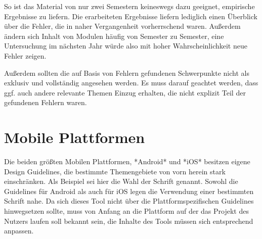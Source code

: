 So ist das Material von nur zwei Semestern keineswegs dazu geeignet, empirische Ergebnisse zu liefern. Die erarbeiteten Ergebnisse liefern lediglich einen Überblick über die Fehler, die in naher Vergangenheit vorherrschend waren. Außerdem ändern sich Inhalt von Modulen häufig von Semester zu Semester, eine Untersuchung im nächsten Jahr würde also mit hoher Wahrscheinlichkeit neue Fehler zeigen.

Außerdem sollten die auf Basis von Fehlern gefundenen Schwerpunkte nicht als exklusiv und vollständig angesehen werden. Es muss darauf geachtet werden, dass ggf. auch andere relevante Themen Einzug erhalten, die nicht explizit Teil der gefundenen Fehlern waren.


\section{Mobile Plattformen}
Die beiden größten Mobilen Plattformen, *Android* und *iOS* besitzen eigene Design Guidelines, die bestimmte Themengebiete von vorn herein stark einschränken.
Als Beispiel sei hier die Wahl der Schrift genannt. Sowohl die Guidelines für Android als auch für iOS legen die Verwendung einer bestimmten Schrift nahe.
Da sich dieses Tool nicht über die Plattformspezifischen Guidelines hinwegsetzen sollte, muss von Anfang an die Plattform  auf der das Projekt des Nutzers laufen soll bekannt sein, die Inhalte des Tools müssen sich entsprechend anpassen.


\clearpage
